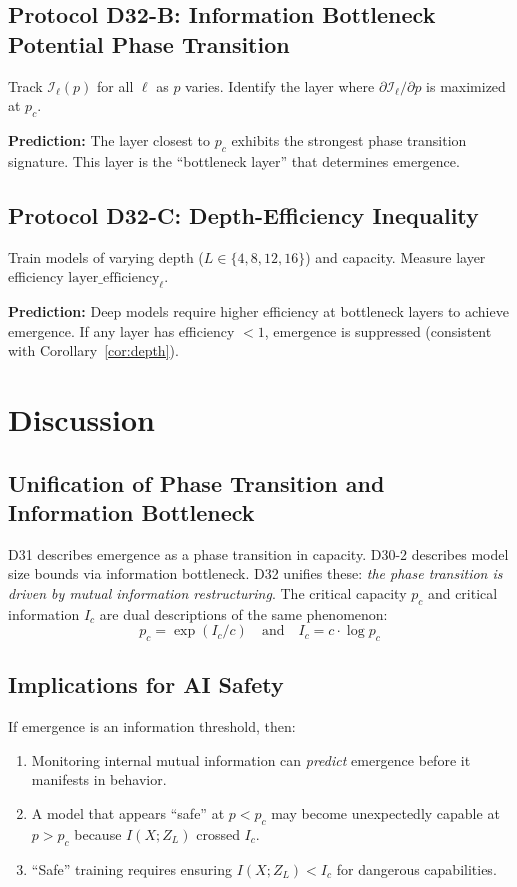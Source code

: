 \documentclass[12pt]{article}
\theoremstyle{definition}
\theoremstyle{remark}
\begin{document}
\subsection{Protocol D32-B: Information Bottleneck Potential Phase Transition}

Track $\mathcal{I}_\ell(p)$ for all $\ell$ as $p$ varies. Identify the layer where $\partial \mathcal{I}_\ell / \partial p$ is maximized at $p_c$.

\textbf{Prediction:} The layer closest to $p_c$ exhibits the strongest phase transition signature. This layer is the ``bottleneck layer'' that determines emergence.

\subsection{Protocol D32-C: Depth-Efficiency Inequality}

Train models of varying depth ($L \in \{4, 8, 12, 16\}$) and capacity. Measure layer efficiency $\text{layer\_efficiency}_\ell$.

\textbf{Prediction:} Deep models require higher efficiency at bottleneck layers to achieve emergence. If any layer has efficiency $< 1$, emergence is suppressed (consistent with Corollary~\ref{cor:depth}).

\section{Discussion}

\subsection{Unification of Phase Transition and Information Bottleneck}

D31 describes emergence as a phase transition in capacity. D30-2 describes model size bounds via information bottleneck. D32 unifies these: \emph{the phase transition is driven by mutual information restructuring}. The critical capacity $p_c$ and critical information $I_c$ are dual descriptions of the same phenomenon:
\[
p_c = \exp(I_c / c) \quad \text{and} \quad I_c = c \cdot \log p_c
\]

\subsection{Implications for AI Safety}

If emergence is an information threshold, then:
\begin{enumerate}
  \item Monitoring internal mutual information can \emph{predict} emergence before it manifests in behavior.
  \item A model that appears ``safe'' at $p < p_c$ may become unexpectedly capable at $p > p_c$ because $I(X; Z_L)$ crossed $I_c$.
  \item ``Safe'' training requires ensuring $I(X; Z_L) < I_c$ for dangerous capabilities.
\end{enumerate}
\end{document}
